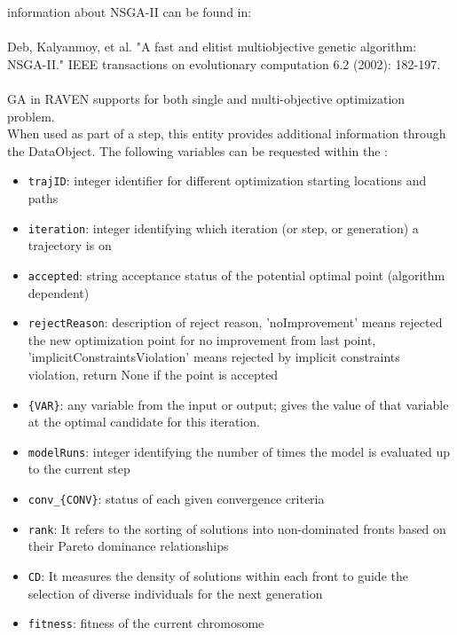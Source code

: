  information about NSGA-II can be found in:\\\\                              Deb, Kalyanmoy, et al.
  "A fast and elitist multiobjective genetic algorithm: NSGA-II." IEEE transactions on evolutionary
  computation 6.2 (2002): 182-197.\\\\                              GA in RAVEN supports for both
  single and multi-objective optimization problem.
\vspace{7pt} \\When used as part of a  step, this entity provides
        additional information through the  DataObject. The
        following variables can be requested within the :
        \begin{itemize}
          \item \texttt{trajID}: integer identifier for different optimization starting locations and paths
             \item \texttt{iteration}: integer identifying which iteration (or step, or generation) a trajectory is on
             \item \texttt{accepted}: string acceptance status of the potential optimal point (algorithm dependent)
             \item \texttt{rejectReason}: description of reject reason, 'noImprovement' means rejected the new optimization point for no improvement from last point, 'implicitConstraintsViolation' means rejected by implicit constraints violation, return None if the point is accepted
             \item \texttt{\{VAR\}}: any variable from the  input or output; gives the value of that variable at the optimal candidate for this iteration.
             \item \texttt{modelRuns}: integer identifying the number of times the model is evaluated up to the current step
             \item \texttt{conv\_\{CONV\}}: status of each given convergence criteria
             \item \texttt{rank}: It refers to the sorting of solutions into non-dominated fronts based on their Pareto dominance relationships
             \item \texttt{CD}: It measures the density of solutions within each front to guide the selection of diverse individuals for the next generation
             \item \texttt{fitness}: fitness of the current chromosome

\end{itemize}
